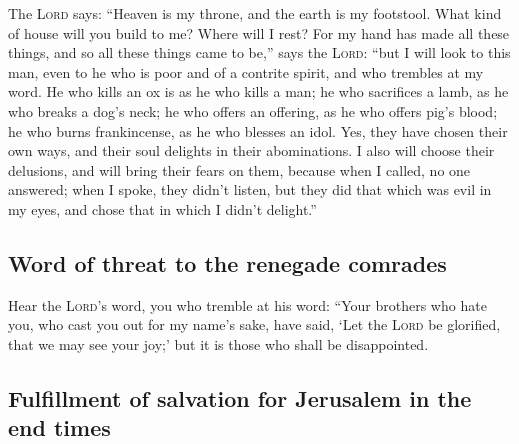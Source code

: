  The \textsc{Lord} says: ``Heaven is my throne, and the
earth is my footstool. What kind of house will you build to me? Where
will I rest?  For my hand has made all these things, and
so all these things came to be,'' says the \textsc{Lord}: ``but I will
look to this man, even to he who is poor and of a contrite spirit, and
who trembles at my word.  He who kills an ox is as he who
kills a man; he who sacrifices a lamb, as he who breaks a dog's neck; he
who offers an offering, as he who offers pig's blood; he who burns
frankincense, as he who blesses an idol. Yes, they have chosen their own
ways, and their soul delights in their abominations.  I
also will choose their delusions, and will bring their fears on them,
because when I called, no one answered; when I spoke, they didn't
listen, but they did that which was evil in my eyes, and chose that in
which I didn't delight.''

\hypertarget{word-of-threat-to-the-renegade-comrades}{%
\subsection{Word of threat to the renegade
comrades}\label{word-of-threat-to-the-renegade-comrades}}

 Hear the \textsc{Lord}'s word, you who tremble at his
word: ``Your brothers who hate you, who cast you out for my name's sake,
have said, `Let the \textsc{Lord} be glorified, that we may see your
joy;' but it is those who shall be disappointed.

\hypertarget{fulfillment-of-salvation-for-jerusalem-in-the-end-times}{%
\subsection{Fulfillment of salvation for Jerusalem in the end
times}\label{fulfillment-of-salvation-for-jerusalem-in-the-end-times}}

